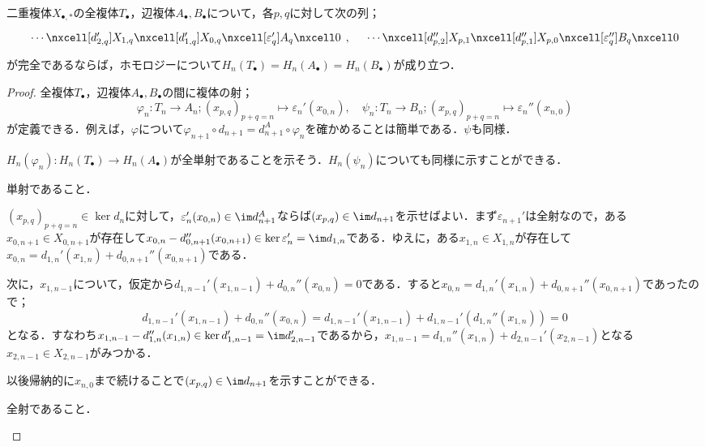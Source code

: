\begin{thm}\label{thm:辺複体のhomologyは同型}
	二重複体$X_{\bullet,\ast}$の全複体$T_\bullet$，辺複体$A_\bullet,B_\bullet$について，各$p,q$に対して次の列；
	\[\begin{tikzcd}
		\cdots\nxcell[d_{2,q}']X_{1,q}\nxcell[d_{1,q}']X_{0,q}\nxcell[\varepsilon_q']A_q\nxcell0
	\end{tikzcd},\quad\begin{tikzcd}
		\cdots\nxcell[d_{p,2}'']X_{p,1}\nxcell[d_{p,1}'']X_{p,0}\nxcell[\varepsilon_q'']B_q\nxcell0
	\end{tikzcd}\]
	が完全であるならば，ホモロジーについて$H_n(T_\bullet)=H_n(A_\bullet)=H_n(B_\bullet)$が成り立つ．
\end{thm}
\begin{proof}
	全複体$T_\bullet$，辺複体$A_\bullet,B_\bullet$の間に複体の射；
	\[\varphi_n:T_n\to A_n;(x_{p,q})_{p+q=n}\mapsto\varepsilon_n'(x_{0,n}),\quad\psi_n:T_n\to B_n;(x_{p,q})_{p+q=n}\mapsto\varepsilon_n''(x_{n,0})\]
	が定義できる．例えば，$\varphi$について$\varphi_{n+1}\circ d_{n+1}=d_{n+1}^A\circ\varphi_n$を確かめることは簡単である．$\psi$も同様．

	$H_n(\varphi_n):H_n(T_\bullet)\to H_n(A_\bullet)$が全単射であることを示そう．$H_n(\psi_n)$についても同様に示すことができる．
	
	\begin{step}
		\item 単射であること．
		
		$(x_{p,q})_{p+q=n}\in\ker d_n$に対して，$\varepsilon_n'(x_{0,n})\in\im d_{n+1}^A$ならば$(x_{p,q})\in\im d_{n+1}$を示せばよい．まず$\varepsilon_{n+1}'$は全射なので，ある$x_{0,n+1}\in X_{0,n+1}$が存在して$x_{0,n}-d_{0,n+1}''(x_{0,n+1})\in\ker\varepsilon_n'=\im d_{1,n}$である．ゆえに，ある$x_{1,n}\in X_{1,n}$が存在して$x_{0,n}=d_{1,n}'(x_{1,n})+d_{0,n+1}''(x_{0,n+1})$である．
		
		次に，$x_{1,n-1}$について，仮定から$d_{1,n-1}'(x_{1,n-1})+d_{0,n}''(x_{0,n})=0$である．すると$x_{0,n}=d_{1,n}'(x_{1,n})+d_{0,n+1}''(x_{0,n+1})$であったので；
		\[d_{1,n-1}'(x_{1,n-1})+d_{0,n}''(x_{0,n})=d_{1,n-1}'(x_{1,n-1})+d_{1,n-1}'(d_{1,n}''(x_{1,n}))=0\]
		となる．すなわち$x_{1,n-1}-d_{1,n}''(x_{1,n})\in\ker d_{1,n-1}'=\im d_{2,n-1}'$であるから，$x_{1,n-1}=d_{1,n}''(x_{1,n})+d_{2,n-1}'(x_{2,n-1})$となる$x_{2,n-1}\in X_{2,n-1}$がみつかる．
		
		以後帰納的に$x_{n,0}$まで続けることで$(x_{p,q})\in\im d_{n+1}$を示すことができる．
		
		\item 全射であること．
		

\end{step}
\end{proof}
